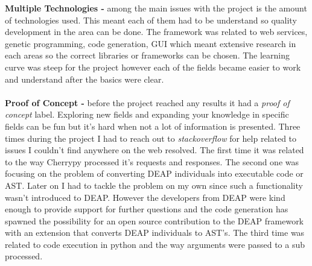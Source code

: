 \textbf{Multiple Technologies -} among the main issues with the project is the amount of technologies used. This meant each of them
had to be understand so quality development in the area can be done. The framework was related to web services, genetic programming,
code generation, GUI which meant extensive research in each areas so the correct libraries or frameworks can be chosen. The learning
curve was steep for the project however each of the fields became easier to work and understand after the basics were clear.
\paragraph{}
\textbf{Proof of Concept -} before the project reached any results it had a \textit{proof of concept} label. Exploring new fields and
expanding your knowledge in specific fields can be fun but it's hard when not a lot of information is presented. Three times during the
project I had to reach out to \textit{stackoverflow} for help related to issues I couldn't find anywhere on the web resolved. The first
time it was related to the way Cherrypy processed it's requests and responses. The second one was focusing on the problem of converting
DEAP individuals into executable code or AST. Later on I had to tackle the problem on my own since such a functionality wasn't introduced to DEAP.
However the developers from DEAP were kind enough to provide support for further questions and the code generation has spawned the possibility
for an open source contribution to the DEAP framework with an extension that converts DEAP individuals to AST's. The third time was related
to code execution in python and the way arguments were passed to a sub processed.